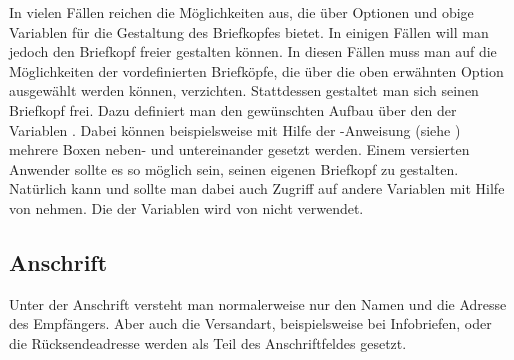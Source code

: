 \begin{Declaration}
\end{Declaration}
In vielen Fällen reichen die Möglichkeiten aus, die  über
Optionen und obige Variablen für die Gestaltung des Briefkopfes bietet. In
einigen Fällen will man jedoch den Briefkopf freier gestalten können. In
diesen Fällen muss man auf die Möglichkeiten der vordefinierten Briefköpfe,
die über die oben erwähnten Option ausgewählt werden können,
verzichten. Stattdessen gestaltet man sich seinen Briefkopf frei. Dazu
definiert man den gewünschten Aufbau über den  der Variablen
. Dabei können beispielsweise mit Hilfe der
-Anweisung (siehe \cite{latex:usrguide}) mehrere Boxen neben-
und untereinander gesetzt werden.  Einem versierten Anwender sollte es so
möglich sein, seinen eigenen Briefkopf zu gestalten. Natürlich kann und sollte
man dabei auch Zugriff auf andere Variablen mit Hilfe von
 nehmen. Die  der
Variablen  wird von \KOMAScript{} nicht verwendet.
%
\EndIndexGroup
%
\EndIndexGroup


\subsection{Anschrift}
%
\BeginIndexGroup
{}%

Unter der Anschrift versteht man normalerweise nur den Namen und die Adresse
des Empfängers. %
\iffalse%
Als \iffree{erste }{}Erweiterung zur Anschrift kann die
Versandart betrachtet werden, die etwa bei \iffree{Einschreiben oder
}{}Infobriefen zur Anwendung kommt. Bei Fensterbriefumschlägen wird auch die
sogenannte Rücksendeadresse \iffree{zur Anschrift}{dazu} gezählt, da sie im
Anschriftfenster zu sehen \iffree{sein wird}{ist}. Die Anschrift folgt
unmittelbar auf den Briefkopf.%
\else%
Aber auch die Versandart, beispielsweise bei Infobriefen, oder die
Rücksendeadresse werden als Teil des Anschriftfeldes gesetzt.%
\fi


